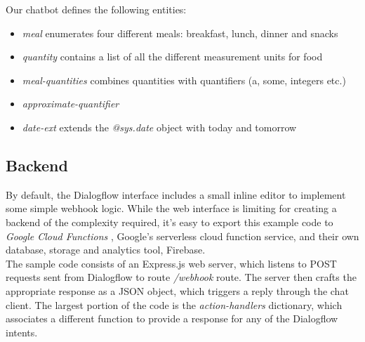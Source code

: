 Our chatbot defines the following entities:
\begin{itemize}
  \item \textit{meal} enumerates four different meals: breakfast, lunch, dinner and snacks
  \item \textit{quantity} contains a list of all the different measurement units for food
  \item \textit{meal-quantities} combines quantities with quantifiers (a, some, integers etc.)
  \item \textit{approximate-quantifier}
  \item \textit{date-ext} extends the \textit{@sys.date} object with today and tomorrow
\end{itemize}

\subsection{Backend}
By default, the Dialogflow interface includes a small inline editor to implement some simple webhook logic. While the web interface is limiting for creating a backend of the complexity required, it's easy to export this example code to \textit{Google Cloud Functions} \cite{gcfwebsite}, Google's serverless cloud function service, and their own database, storage and analytics tool, Firebase. \\
The sample code consists of an Express.js \cite{expresswebsite} web server, which listens to POST requests sent from Dialogflow to route \textit{/webhook} route. The server then crafts the appropriate response as a JSON object, which triggers a reply through the chat client. The largest portion of the code is the \textit{action-handlers} dictionary, which associates a different function to provide a response for any of the Dialogflow intents. 

